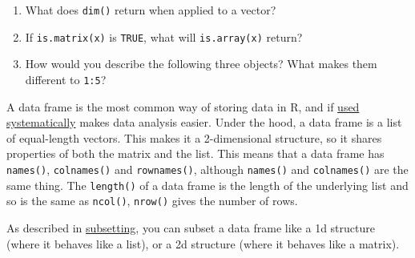 \begin{enumerate}
\def\labelenumi{\arabic{enumi}.}
\item
  What does \texttt{dim()} return when applied to a vector?
\item
  If \texttt{is.matrix(x)} is \texttt{TRUE}, what will
  \texttt{is.array(x)} return?
\item
  How would you describe the following three objects? What makes them
  different to \texttt{1:5}?

\begin{Shaded}
\begin{Highlighting}[]
\StringTok{ }\NormalTok{(}\NormalTok{:}\NormalTok{, }\NormalTok{(}\NormalTok{, }\NormalTok{, }\NormalTok{))}
\StringTok{ }\NormalTok{(}\NormalTok{:}\NormalTok{, }\NormalTok{(}\NormalTok{, }\NormalTok{, }\NormalTok{))}
\StringTok{ }\NormalTok{(}\NormalTok{:}\NormalTok{, }\NormalTok{(}\NormalTok{, }\NormalTok{, }\NormalTok{))}
\end{Highlighting}
\end{Shaded}
\end{enumerate}


A data frame is the most common way of storing data in R, and if
\href{http://vita.had.co.nz/papers/tidy-data.pdf}{used systematically}
makes data analysis easier. Under the hood, a data frame is a list of
equal-length vectors. This makes it a 2-dimensional structure, so it
shares properties of both the matrix and the list. This means that a
data frame has \texttt{names()}, \texttt{colnames()} and
\texttt{rownames()}, although \texttt{names()} and \texttt{colnames()}
are the same thing. The \texttt{length()} of a data frame is the length
of the underlying list and so is the same as \texttt{ncol()},
\texttt{nrow()} gives the number of rows.

As described in \hyperref[subsetting]{subsetting}, you can subset a data
frame like a 1d structure (where it behaves like a list), or a 2d
structure (where it behaves like a matrix).

